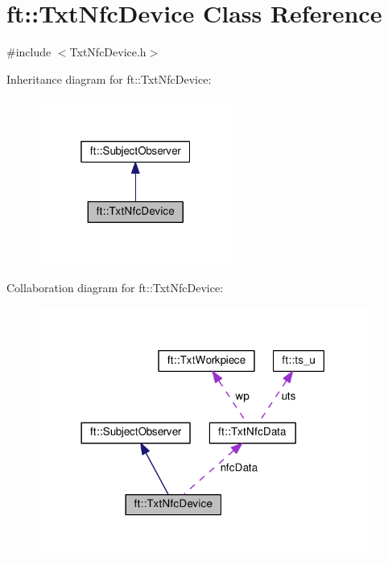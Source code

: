 \hypertarget{classft_1_1_txt_nfc_device}{}\section{ft\+:\+:Txt\+Nfc\+Device Class Reference}
\label{classft_1_1_txt_nfc_device}


{\ttfamily \#include $<$Txt\+Nfc\+Device.\+h$>$}



Inheritance diagram for ft\+:\+:Txt\+Nfc\+Device\+:
\nopagebreak
\begin{figure}[H]
\begin{center}
\leavevmode
\includegraphics[width=181pt]{classft_1_1_txt_nfc_device__inherit__graph}
\end{center}
\end{figure}


Collaboration diagram for ft\+:\+:Txt\+Nfc\+Device\+:
\nopagebreak
\begin{figure}[H]
\begin{center}
\leavevmode
\includegraphics[width=306pt]{classft_1_1_txt_nfc_device__coll__graph}
\end{center}
\end{figure}
